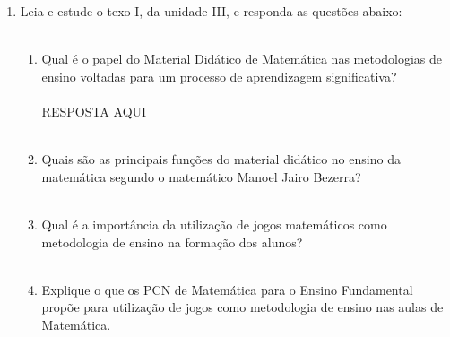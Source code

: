 \documentclass[a4paper, 12pt]{article}
\begin{document}
\begin{enumerate}
\item Leia e estude o texo I, da unidade III, e responda as questões abaixo: \\ \\
  \begin{enumerate}
  \item Qual é o papel do Material Didático de Matemática nas metodologias de ensino voltadas para um processo de aprendizagem significativa? \\ \\
    RESPOSTA AQUI \\ \\
  \item Quais são as principais funções do material didático no ensino da matemática segundo o matemático Manoel Jairo Bezerra? \\ \\
  \item Qual é a importância da utilização de jogos matemáticos como metodologia de ensino na formação dos alunos? \\ \\
  \item Explique o que os PCN de Matemática para o Ensino Fundamental propõe para utilização de jogos como metodologia de ensino nas aulas de Matemática. \\ \\
  \end{enumerate}


\end{enumerate}
\end{document}
